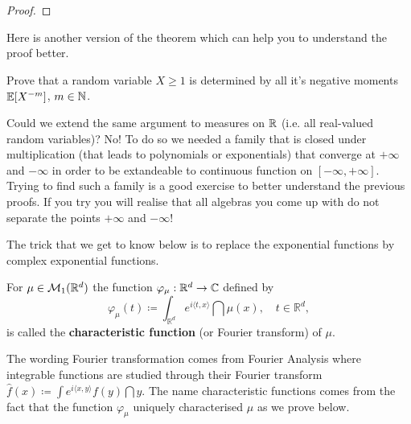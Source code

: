 \begin{proof}[Proof]
\end{proof}
Here is another version of the theorem which can help you to understand the proof better.
\begin{luebung}
	Prove that a random variable $X\geq 1$ is determined by all it's negative moments $\mathbb{E}[X^{-m}]$, $m\in\mathbb{N}$.
\end{luebung}

Could we extend the same argument to measures on $\mathbb{R}$ (i.e. all real-valued random variables)? No! To do so we needed a family that is closed under multiplication (that leads to polynomials or exponentials) that converge at $+\infty$ and $-\infty$ in order to be extandeable to continuous function on $[-\infty,+\infty]$. Trying to find such a family is a good exercise to better understand the previous proofs. If you try you will realise that all algebras you come up with do not separate the points $+\infty$ and $-\infty$!\smallskip


The trick that we get to know below is to replace the exponential functions by complex exponential functions.
\begin{ldef}
\begin{deff}

			For $\mu \in \mathcal{M}_1(\mathbb{R}^d)$ the function $\varphi_\mu:\mathbb{R}^d\to\mathbb{C}$ defined by $$\varphi_{\mu}(t) \coloneqq \int_{\mathbb{R}^d} e^{i\langle t,x \rangle} \dint\mu (x), \quad t\in \mathbb{R}^d,$$ is called the \textbf{characteristic function} (or Fourier transform) of $\mu$.
\end{deff}
\end{ldef}
The wording Fourier transformation comes from Fourier Analysis where integrable functions are studied through their Fourier transform $\hat{f}(x) \coloneqq \int e^{i\langle x, y \rangle} f(y) \dint y$. The name characteristic functions comes from the fact that the function $\varphi_\mu$ uniquely characterised $\mu$ as we prove below.\smallskip

